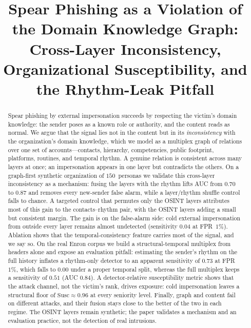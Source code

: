 \documentclass[conference]{IEEEtran}
\newif\ifanon
\begin{document}
\title{Spear Phishing as a Violation of the Domain Knowledge Graph:\\
Cross-Layer Inconsistency, Organizational Susceptibility, and the Rhythm-Leak Pitfall}

\ifanon
\author{\IEEEauthorblockN{Anonymous Author(s)}
\IEEEauthorblockA{Anonymous Institution(s)}}
\else
\author{
\and
{}
}
\fi

\maketitle

\begin{abstract}
Spear phishing by external impersonation succeeds by respecting the victim's domain knowledge: the sender
poses as a known role or authority, and the content reads as normal. We argue that the signal lies not in the
content but in its \emph{inconsistency} with the organization's domain knowledge, which we model as a
multiplex graph of relations over one set of accounts---contacts, hierarchy, competencies, public footprint,
platforms, routines, and temporal rhythm. A genuine relation is consistent across many layers at once; an
impersonation appears in one layer but contradicts the others. On a graph-first synthetic organization of
$150$~personas we validate this cross-layer inconsistency as a mechanism: fusing the layers with the rhythm
lifts AUC from $0.70$ to $0.87$ and removes every new-sender false alarm, while a layer/rhythm shuffle control
falls to chance. A targeted control that permutes only the OSINT layers attributes most of this gain to the
contacts--rhythm pair, with the OSINT layers adding a small but consistent margin. The gain is on the
false-alarm side: cold external impersonation from outside every layer
remains almost undetected (sensitivity $0.04$ at FPR~$1\%$). Ablation shows that the temporal-consistency
feature carries most of the signal, and we say so. On the real Enron corpus we build a structural-temporal multiplex from headers alone and expose an
evaluation pitfall: estimating the sender's rhythm on the full history inflates a rhythm-only detector to an
apparent sensitivity of $0.73$ at FPR~$1\%$, which falls to $0.00$ under a proper temporal split, whereas the
full multiplex keeps a sensitivity of $0.51$ (AUC $0.84$). A detector-relative susceptibility metric shows that the attack channel, not the
victim's rank, drives exposure: cold impersonation leaves a structural floor of $\mathrm{Susc}\approx0.96$ at
every seniority level. Finally, graph and content fail on different attacks, and their fusion stays close to
the better of the two in each regime. The OSINT layers remain synthetic; the paper validates a mechanism and an evaluation practice, not
the detection of real intrusions.
\end{abstract}
\end{document}
